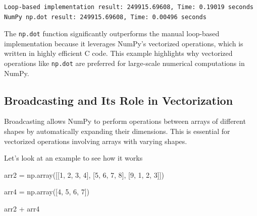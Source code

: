 \documentclass[
  letterpaper,
  DIV=11,
  numbers=noendperiod]{scrreprt}
\newenvironment{Shaded}{\begin{snugshade}}{\end{snugshade}}
\newcommand{\DecValTok}[1]{\textcolor[rgb]{0.68,0.00,0.00}{#1}}
\newcommand{\NormalTok}[1]{\textcolor[rgb]{0.00,0.23,0.31}{#1}}
\newcommand{\OperatorTok}[1]{\textcolor[rgb]{0.37,0.37,0.37}{#1}}
\begin{document}
\begin{verbatim}
Loop-based implementation result: 249915.69608, Time: 0.19019 seconds
NumPy np.dot result: 249915.69608, Time: 0.00496 seconds
\end{verbatim}

The \texttt{np.dot} function significantly outperforms the manual
loop-based implementation because it leverages NumPy's vectorized
operations, which is written in highly efficient C code. This example
highlights why vectorized operations like \texttt{np.dot} are preferred
for large-scale numerical computations in NumPy.

\hypertarget{broadcasting-and-its-role-in-vectorization}{%
\subsection{Broadcasting and Its Role in
Vectorization}\label{broadcasting-and-its-role-in-vectorization}}

Broadcasting allows NumPy to perform operations between arrays of
different shapes by automatically expanding their dimensions. This is
essential for vectorized operations involving arrays with varying
shapes.

Let's look at an example to see how it works

\begin{Shaded}
\begin{Highlighting}[]
\NormalTok{arr2 }\OperatorTok{=}\NormalTok{ np.array([[}\DecValTok{1}\NormalTok{, }\DecValTok{2}\NormalTok{, }\DecValTok{3}\NormalTok{, }\DecValTok{4}\NormalTok{], }
\NormalTok{                 [}\DecValTok{5}\NormalTok{, }\DecValTok{6}\NormalTok{, }\DecValTok{7}\NormalTok{, }\DecValTok{8}\NormalTok{], }
\NormalTok{                 [}\DecValTok{9}\NormalTok{, }\DecValTok{1}\NormalTok{, }\DecValTok{2}\NormalTok{, }\DecValTok{3}\NormalTok{]])}
\end{Highlighting}
\end{Shaded}

\begin{Shaded}
\begin{Highlighting}[]
\NormalTok{arr4 }\OperatorTok{=}\NormalTok{ np.array([}\DecValTok{4}\NormalTok{, }\DecValTok{5}\NormalTok{, }\DecValTok{6}\NormalTok{, }\DecValTok{7}\NormalTok{])}
\end{Highlighting}
\end{Shaded}

\begin{Shaded}
\begin{Highlighting}[]
\NormalTok{arr2 }\OperatorTok{+}\NormalTok{ arr4}
\end{Highlighting}
\end{Shaded}
\end{document}
